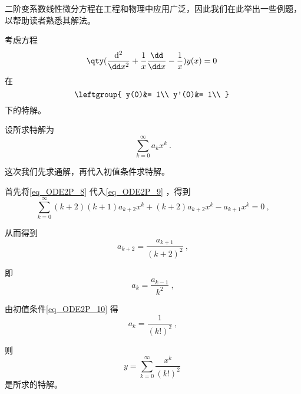 二阶变系数线性微分方程在工程和物理中应用广泛，因此我们在此举出一些例题，以帮助读者熟悉其解法。

\begin{example}{}\label{ex_ODE2P_2}
考虑方程
\begin{equation}\label{eq_ODE2P_9}
\qty(\frac{\mathrm{d}^2}{\dd x^2}+\frac{1}{x}\frac{\dd}{\dd x}-\frac{1}{x})y(x)=0~
\end{equation}
在
\begin{equation}\label{eq_ODE2P_10}
\leftgroup{
    y(0)&= 1\\
    y'(0)&= 1\\
}~
\end{equation}
下的特解。

设所求特解为
\begin{equation}\label{eq_ODE2P_8}
\sum\limits_{k=0}^\infty a_kx^k~.
\end{equation}

这次我们先求通解，再代入初值条件求特解。

首先将\autoref{eq_ODE2P_8} 代入\autoref{eq_ODE2P_9} ，得到
\begin{equation}
\sum\limits_{k=0}^\infty (k+2)(k+1)a_{k+2}x^k+(k+2)a_{k+2}x^k-a_{k+1}x^k=0~,
\end{equation}

从而得到
\begin{equation}
a_{k+2}=\frac{a_{k+1}}{(k+2)^2}~,
\end{equation}

即
\begin{equation}\label{eq_ODE2P_11}
a_k=\frac{a_{k-1}}{k^2}~,
\end{equation}

由初值条件\autoref{eq_ODE2P_10} 得
\begin{equation}
a_k=\frac{1}{(k!)^2}~,
\end{equation}

则
\begin{equation}
y=\sum\limits_{k=0}^\infty \frac{x^k}{(k!)^2}~
\end{equation}
是所求的特解。


\end{example}




